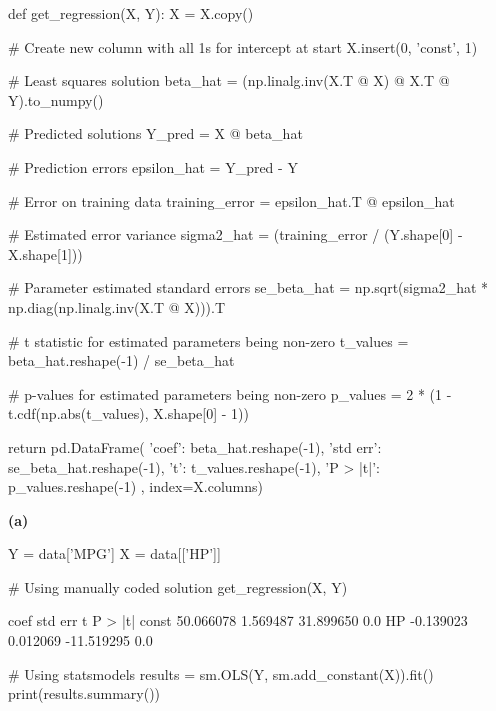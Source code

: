 \begin{python}
def get_regression(X, Y):
    X = X.copy()
    
    # Create new column with all 1s for intercept at start
    X.insert(0, 'const', 1)
    
    # Least squares solution
    beta_hat = (np.linalg.inv(X.T @ X) @ X.T @ Y).to_{n}umpy()

    # Predicted solutions
    Y_pred = X @ beta_hat

    # Prediction errors
    epsilon_hat = Y_pred - Y

    # Error on training data
    training_error = epsilon_hat.T @ epsilon_hat
    
    # Estimated error variance
    sigma2_hat = (training_error / (Y.shape[0] - X.shape[1]))

    # Parameter estimated standard errors
    se_beta_hat = np.sqrt(sigma2_hat * np.diag(np.linalg.inv(X.T @ X))).T

    # t statistic for estimated parameters being non-zero
    t_values = beta_hat.reshape(-1) / se_beta_hat

    # p-values for estimated parameters being non-zero
    p_values = 2 * (1 - t.cdf(np.abs(t_values), X.shape[0] - 1))
    
    return pd.DataFrame({
        'coef': beta_hat.reshape(-1),
        'std err': se_beta_hat.reshape(-1),
        't': t_values.reshape(-1),
        'P > |t|': p_values.reshape(-1) 
        }, index=X.columns)
\end{python}


\textbf{(a)}

\begin{python}
Y = data['MPG']
X = data[['HP']]
\end{python}

\begin{python}
# Using manually coded solution
get_regression(X, Y)
\end{python}

\begin{console}
	coef	std err	t	P > |t|
const	50.066078	1.569487	31.899650	0.0
HP	-0.139023	0.012069	-11.519295	0.0
\end{console}

\begin{python}
# Using statsmodels
results = sm.OLS(Y, sm.add_constant(X)).fit()
print(results.summary())
\end{python}

